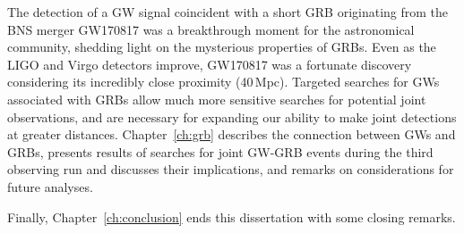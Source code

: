 The detection of a \ac{GW} signal coincident with a short \ac{GRB} originating from the \ac{BNS} merger GW170817 was a breakthrough moment for the astronomical community, shedding light on the mysterious properties of \acp{GRB}.
Even as the LIGO and Virgo detectors improve, GW170817 was a fortunate discovery considering its incredibly close proximity (40\,Mpc).
Targeted searches for \acp{GW} associated with \acp{GRB} allow much more sensitive searches for potential joint observations, and are necessary for expanding our ability to make joint detections at greater distances.
Chapter~\ref{ch:grb} describes the connection between \acp{GW} and \acp{GRB}, presents results of searches for joint GW-GRB events during the third observing run and discusses their implications, and remarks on considerations for future analyses.

Finally, Chapter~\ref{ch:conclusion} ends this dissertation with some closing remarks.
